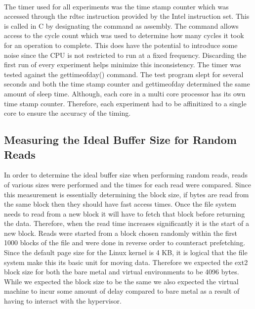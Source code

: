 \documentclass[letterpaper,twocolumn,10pt]{article}
\begin{document}
\paragraph{}
The timer used for all experiments was the time stamp counter which was accessed through the rdtsc instruction provided by the Intel instruction set. 
This is called in C by designating the command as assembly. 
The command allows access to the cycle count which was used to determine how many cycles it took for an operation to complete. 
This does have the potential to introduce some noise since the CPU is not restricted to run at a fixed frequency. 
Discarding the first run of every experiment helps minimize this inconsistency. 
The timer was tested against the gettimeofday() command. 
The test program slept for several seconds and both the time stamp counter and gettimeofday determined the same amount of sleep time. 
Although, each core in a multi core processor has its own time stamp counter.
Therefore, each experiment had to be affinitized to a single core to ensure the accuracy of the timing. 

\subsection{Measuring the Ideal Buffer Size for Random Reads}

In order to determine the ideal buffer size when performing random reads, reads of various sizes were performed and the times for each read were compared. 
Since this measurement is essentially determining the block size, if bytes are read from the same block then they should have fast access times. 
Once the file system needs to read from a new block it will have to fetch that block before returning the data. 
Therefore, when the read time increases significantly it is the start of a new block.
Reads were started from a block chosen randomly within the first 1000 blocks of the file and were done in reverse order to counteract prefetching. 
Since the default page size for the Linux kernel is 4 KB, it is logical that the file system make this its basic unit for moving data. 
Therefore we expected the ext2 block size for both the bare metal and virtual environments to be 4096 bytes.
While we expected the block size to be the same we also expected the virtual machine to incur some amount of delay compared to bare metal as a result of having to interact with the hypervisor.
\end{document}
